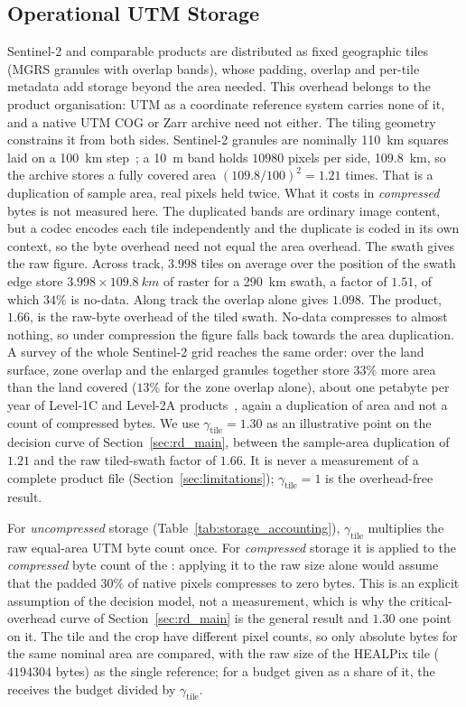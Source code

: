 \subsection{Operational UTM Storage}
\label{sec:overhead}
Sentinel-2 and comparable products are distributed as fixed geographic
tiles (MGRS granules with overlap bands), whose padding, overlap and
per-tile metadata add storage beyond the area needed. This overhead
belongs to the product organisation: UTM as a coordinate reference system
carries none of it, and a native UTM COG or Zarr archive need not either.
The tiling geometry constrains it from both sides. Sentinel-2 granules
are nominally \SI{110}{km} squares laid on a \SI{100}{km}
step~\cite{esa_s2_products}; a \SI{10}{m} band holds $10980$ pixels per
side, \SI{109.8}{km}, so the archive stores a fully covered area
$(109.8/100)^2=1.21$ times. That is a duplication of sample area, real
pixels held twice. What it costs in \emph{compressed} bytes is not
measured here. The duplicated bands are ordinary image content, but a
codec encodes each tile independently and the duplicate is coded in its
own context, so the byte overhead need not equal the area overhead. The
swath gives the raw figure. Across track, $3.998$ tiles on average over
the position of the swath edge store $3.998\times\SI{109.8}{km}$ of
raster for a \SI{290}{km} swath, a factor of $1.51$, of which $34\%$ is
no-data. Along track the overlap alone gives $1.098$. The product, $1.66$,
is the raw-byte overhead of the tiled swath. No-data compresses to
almost nothing, so under compression the figure falls back towards the
area duplication. A survey of the whole Sentinel-2 grid reaches the same
order: over the land surface, zone overlap and the enlarged granules
together store $33\%$ more area than the land covered ($13\%$ for the
zone overlap alone), about one petabyte per year of Level-1C and
Level-2A products~\cite{bauer2023wasting}, again a duplication of area
and not a count of compressed bytes. We use
$\gamma_{\mathrm{tile}}=1.30$ as an illustrative point on the decision
curve of Section~\ref{sec:rd_main}, between the sample-area duplication
of $1.21$ and the raw tiled-swath factor of $1.66$. It is never a
measurement of a complete product file
(Section~\ref{sec:limitations}); $\gamma_{\mathrm{tile}}=1$ is the
overhead-free result.

For \emph{uncompressed} storage (Table~\ref{tab:storage_accounting}),
$\gamma_{\mathrm{tile}}$ multiplies the raw equal-area UTM byte count
once. For \emph{compressed} storage it is applied to the
\emph{compressed} byte count of the : applying it
to the raw size alone would assume that the padded $30\%$ of native
pixels compresses to zero bytes. This is an explicit assumption of the
decision model, not a measurement, which is why the critical-overhead
curve of Section~\ref{sec:rd_main} is the general result and $1.30$ one
point on it. The tile and the crop have different pixel counts, so only
absolute bytes for the same nominal area are compared, with the raw size
of the HEALPix tile ($\num{4194304}$ bytes) as the single reference; for
a budget given as a share of it, the  receives the budget
divided by $\gamma_{\mathrm{tile}}$.

